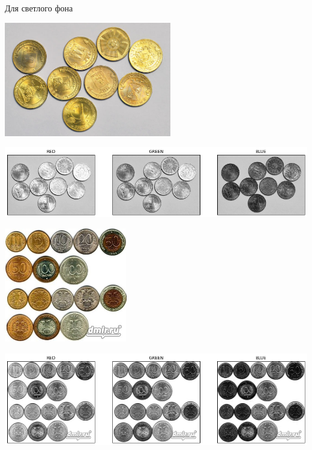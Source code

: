\documentclass[12pt, a4paper]{article}
\begin{document}
			\newpage
			\begin{center}
				Для светлого фона

				\includegraphics[height=5cm]{Money_2.png}

				\includegraphics[width=15cm]{2.png}

				\includegraphics[height=5cm]{Money_3.png}

				\includegraphics[width=15cm]{3.png}
			\end{center}

		\newpage
\end{document}
